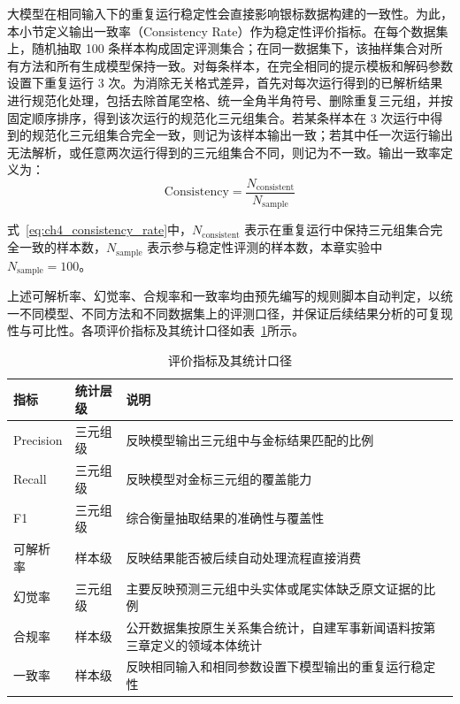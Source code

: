   大模型在相同输入下的重复运行稳定性会直接影响银标数据构建的一致性。为此，本小节定义输出一致率（Consistency Rate）作为稳定性评价指标。在每个数据集上，随机抽取 100 条样本构成固定评测集合；在同一数据集下，该抽样集合对所有方法和所有生成模型保持一致。对每条样本，在完全相同的提示模板和解码参数设置下重复运行 3 次。为消除无关格式差异，首先对每次运行得到的已解析结果进行规范化处理，包括去除首尾空格、统一全角半角符号、删除重复三元组，并按固定顺序排序，得到该次运行的规范化三元组集合。若某条样本在 3 次运行中得到的规范化三元组集合完全一致，则记为该样本输出一致；若其中任一次运行输出无法解析，或任意两次运行得到的三元组集合不同，则记为不一致。输出一致率定义为：
  \begin{equation}
  \mathrm{Consistency}=\frac{N_{\mathrm{consistent}}}{N_{\mathrm{sample}}}
  \label{eq:ch4_consistency_rate}
  \end{equation}

  式~\eqref{eq:ch4_consistency_rate}中，$N_{\mathrm{consistent}}$ 表示在重复运行中保持三元组集合完全一致的样本数，$N_{\mathrm{sample}}$ 表示参与稳定性评测的样本数，本章实验中 $N_{\mathrm{sample}}=100$。

上述可解析率、幻觉率、合规率和一致率均由预先编写的规则脚本自动判定，以统一不同模型、不同方法和不同数据集上的评测口径，并保证后续结果分析的可复现性与可比性。各项评价指标及其统计口径如表~\ref{tab:evaluation_metrics}所示。

\begin{table}[htbp]
  \centering
  \caption{评价指标及其统计口径}
  \label{tab:evaluation_metrics}
  {\renewcommand{\arraystretch}{1.18}
  \small
  \setlength{\tabcolsep}{4pt}
  \begin{tabularx}{0.98\textwidth}{
    >{\raggedright\arraybackslash}p{}
    >{\raggedright\arraybackslash}p{}
    >{\raggedright\arraybackslash}X
  }
    \toprule
    指标 & 统计层级 & 说明 \\
    \midrule
    Precision
    & 三元组级
    & 反映模型输出三元组中与金标结果匹配的比例 \\

    Recall
    & 三元组级
    & 反映模型对金标三元组的覆盖能力 \\

    F1
    & 三元组级
    & 综合衡量抽取结果的准确性与覆盖性 \\

    可解析率
    & 样本级
    & 反映结果能否被后续自动处理流程直接消费 \\

    幻觉率
    & 三元组级
    & 主要反映预测三元组中头实体或尾实体缺乏原文证据的比例 \\

    合规率
    & 样本级
    & 公开数据集按原生关系集合统计，自建军事新闻语料按第三章定义的领域本体统计 \\

    一致率
    & 样本级
    & 反映相同输入和相同参数设置下模型输出的重复运行稳定性 \\
    \bottomrule
  \end{tabularx}}
\end{table}

